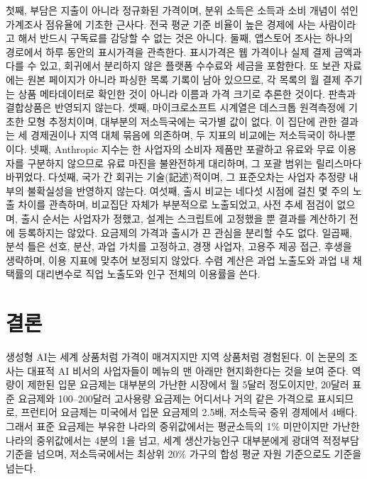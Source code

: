 \documentclass[11pt]{article}
\theoremstyle{definition}
\theoremstyle{remark}
\begin{document}
첫째, 부담은 지출이 아니라 정규화된 가격이며, 분위 소득은 소득과 소비 개념이 섞인 가계조사 점유율에 기초한 근사다. 전국 평균 기준 비율이 높은 경제에 사는 사람이라고 해서 반드시 구독료를 감당할 수 없는 것은 아니다. 둘째, 앱스토어 조사는 하나의 경로에서 하루 동안의 표시가격을 관측한다. 표시가격은 웹 가격이나 실제 결제 금액과 다를 수 있고, 회귀에서 분리하지 않은 플랫폼 수수료와 세금을 포함한다. 또 보관 자료에는 원본 페이지가 아니라 파싱한 목록 기록이 남아 있으므로, 각 목록의 월 결제 주기는 상품 메타데이터로 확인한 것이 아니라 이름과 가격 크기로 추론한 것이다. 판촉과 결합상품은 반영되지 않는다. 셋째, 마이크로소프트 시계열은 데스크톱 원격측정에 기초한 모형 추정치이며, 대부분의 저소득국에는 국가별 값이 없다. 이 집단에 관한 결과는 세 경제권이나 지역 대체 묶음에 의존하며, 두 지표의 비교에는 저소득국이 하나뿐이다. 넷째, Anthropic 지수는 한 사업자의 소비자 제품만 포괄하고 유료와 무료 이용자를 구분하지 않으므로 유료 마진을 불완전하게 대리하며, 그 포괄 범위는 릴리스마다 바뀌었다. 다섯째, 국가 간 회귀는 기술(記述)적이며, 그 표준오차는 사업자 추정량 내부의 불확실성을 반영하지 않는다. 여섯째, 출시 비교는 네다섯 시점에 걸친 몇 주의 노출 차이를 관측하며, 비교집단 자체가 부분적으로 노출되었고, 사전 추세 점검이 없으며, 출시 순서는 사업자가 정했고, 설계는 스크립트에 고정했을 뿐 결과를 계산하기 전에 등록하지는 않았다. 요금제의 가격과 출시가 끈 관심을 분리할 수도 없다. 일곱째, 분석 틀은 선호, 분산, 과업 가치를 고정하고, 경쟁 사업자, 고용주 제공 접근, 후생을 생략하며, 이용 지표에 맞추어 보정되지 않았다. 수렴 계산은 과업 노출도와 과업 내 채택률의 대리변수로 직업 노출도와 인구 전체의 이용률을 쓴다.

\section{결론}\label{sec:conclusion}

생성형 AI는 세계 상품처럼 가격이 매겨지지만 지역 상품처럼 경험된다. 이 논문의 조사는 대표적 AI 비서의 사업자들이 메뉴의 맨 아래만 현지화한다는 것을 보여 준다. 역량이 제한된 입문 요금제는 대부분의 가난한 시장에서 월 5달러 정도이지만, 20달러 표준 요금제와 100--200달러 고사용량 요금제는 어디서나 거의 같은 가격으로 표시되므로, 프런티어 요금제는 미국에서 입문 요금제의 2.5배, 저소득국 중위 경제에서 4배다. 그래서 표준 요금제는 부유한 나라의 중위값에서는 평균소득의 1\% 미만이지만 가난한 나라의 중위값에서는 4분의 1을 넘고, 세계 생산가능인구 대부분에게 광대역 적정부담 기준을 넘으며, 저소득국에서는 최상위 20\% 가구의 합성 평균 자원 기준으로도 기준을 넘는다.
\end{document}
